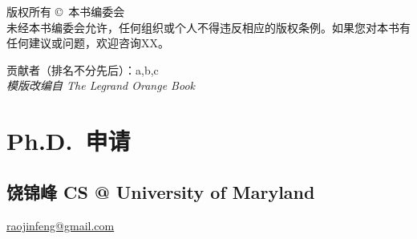 \documentclass[11pt,fleqn,openany]{book} %
\begin{document}
\noindent 版权所有 \copyright\ 本书编委会\\ %
未经本书编委会允许，任何组织或个人不得违反相应的版权条例。如果您对本书有任何建议或问题，欢迎咨询XX。



\noindent 贡献者（排名不分先后）：a,b,c\\ %

\noindent \textit{模版改编自 The Legrand Orange Book} %



\pagestyle{empty} %


\setcounter{tocdepth}{1}
\tableofcontents %

\cleardoublepage %

\pagestyle{fancy} %



\cleardoublepage
\chapter{Ph.D.~申请}
\section{饶锦峰 CS @ University of Maryland}
\hfill \href{mailto:raojinfeng@gmail.com}{raojinfeng@gmail.com}
\end{document}
